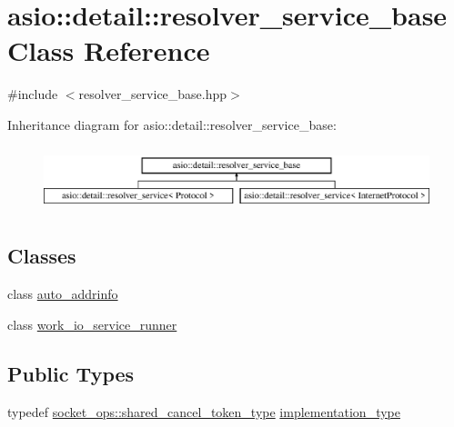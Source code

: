 \hypertarget{classasio_1_1detail_1_1resolver__service__base}{}\section{asio\+:\+:detail\+:\+:resolver\+\_\+service\+\_\+base Class Reference}
\label{classasio_1_1detail_1_1resolver__service__base}


{\ttfamily \#include $<$resolver\+\_\+service\+\_\+base.\+hpp$>$}

Inheritance diagram for asio\+:\+:detail\+:\+:resolver\+\_\+service\+\_\+base\+:\begin{figure}[H]
\begin{center}
\leavevmode
\includegraphics[height=1.904762cm]{classasio_1_1detail_1_1resolver__service__base}
\end{center}
\end{figure}
\subsection*{Classes}
\begin{DoxyCompactItemize}
\item 
class \hyperlink{classasio_1_1detail_1_1resolver__service__base_1_1auto__addrinfo}{auto\+\_\+addrinfo}
\item 
class \hyperlink{classasio_1_1detail_1_1resolver__service__base_1_1work__io__service__runner}{work\+\_\+io\+\_\+service\+\_\+runner}
\end{DoxyCompactItemize}
\subsection*{Public Types}
\begin{DoxyCompactItemize}
\item 
typedef \hyperlink{namespaceasio_1_1detail_1_1socket__ops_a6f7dec33c65c050a3ee96d6b17dafc9c}{socket\+\_\+ops\+::shared\+\_\+cancel\+\_\+token\+\_\+type} \hyperlink{classasio_1_1detail_1_1resolver__service__base_ab07ff8adc9e2f3d5841021e99e190c16}{implementation\+\_\+type}
\end{DoxyCompactItemize}
